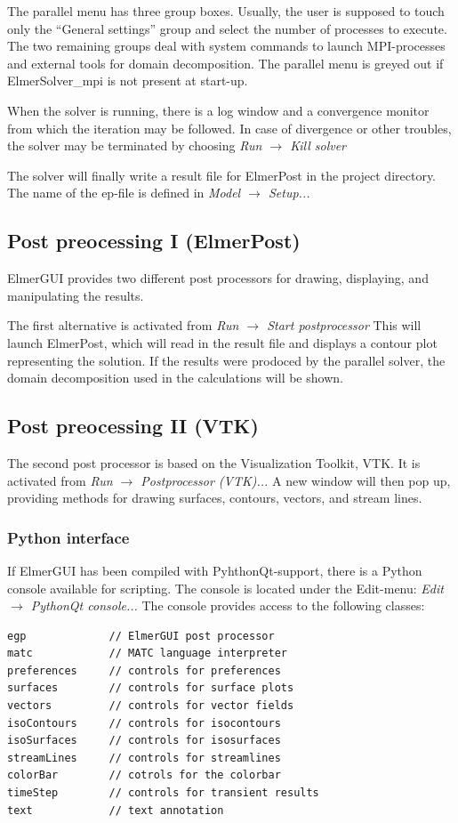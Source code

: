 \documentclass[a4paper,12pt]{article}
\newcommand{\menu}[2]{{\it \vskip2mm #1 $\rightarrow$ #2 \vskip2mm}}
\begin{document}
The parallel menu has three group boxes. Usually, the user is supposed to touch
only the ``General settings'' group and select the number of processes to execute.
The two remaining groups deal with system commands to launch MPI-processes and
external tools for domain decomposition.  The parallel menu is greyed out if
ElmerSolver\_mpi is not present at start-up.

When the solver is running, there is a log window and a convergence monitor
from which the iteration may be followed. In case of divergence or other troubles,
the solver may be terminated by choosing
\menu{Run}{Kill solver}

The solver will finally write a result file for ElmerPost in the project directory.
The name of the ep-file is defined in
\menu{Model}{Setup...}

\subsection{Post preocessing I (ElmerPost)}

ElmerGUI provides two different post processors for drawing, displaying, and manipulating the results.

The first alternative is activated from
\menu{Run}{Start postprocessor}
\noindent This will launch ElmerPost, which will read in the result file and displays a contour plot representing the solution. If the results were prodoced by the parallel solver, the domain decomposition used in the calculations will be shown.

\subsection{Post preocessing II (VTK)}

The second post processor is based on the Visualization Toolkit, VTK. It is activated from
\menu{Run}{Postprocessor (VTK)...}
\noindent A new window will then pop up, providing methods for drawing surfaces, contours,
vectors, and stream lines.

\subsubsection{Python interface}

If ElmerGUI has been compiled with PyhthonQt-support, there is a Python console
available for scripting. The console is located under the Edit-menu:
\menu{Edit}{PythonQt console...}
\noindent The console provides access to the following classes:
\begin{footnotesize}
\begin{verbatim}
egp             // ElmerGUI post processor
matc            // MATC language interpreter
preferences     // controls for preferences
surfaces        // controls for surface plots
vectors	        // controls for vector fields
isoContours     // controls for isocontours
isoSurfaces     // controls for isosurfaces
streamLines     // controls for streamlines
colorBar        // cotrols for the colorbar
timeStep        // controls for transient results
text            // text annotation
\end{verbatim}
\end{footnotesize}
\end{document}
